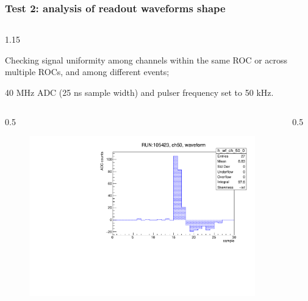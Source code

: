 \documentclass{beamer}
\begin{document}
\begin{frame}
    \frametitle{Test 2: analysis of readout waveforms shape}
    \vspace{-4mm}
    \begin{columns}
\begin{column}{1.15\framewidth}
    \setlength{\leftmargini}{1.2em}
 \begin{itemize}
 {\small
  \item Checking signal uniformity among channels within the same ROC or across multiple ROCs, and among different events;
  \item 40 MHz ADC (25 ns sample width) and pulser frequency set to 50 kHz.}
  \end{itemize}
    \end{column}
    \end{columns}
    \vspace{0mm}
    \begin{columns}
\begin{column}{0.5\framewidth}
         \begin{figure}[!h]
      \centering
      \hspace*{-2em}
      \includegraphics[width=1.\columnwidth]{figures/pdf/wf_ch50_0.pdf}
     \label{fig:normalhits}
\end{figure}
\end{column}
\begin{column}{0.5\framewidth}
      \begin{figure}[!h]
      \centering
            \hspace*{-1em}

\end{figure}
\end{column}
\end{columns}
\end{frame}
\end{document}
